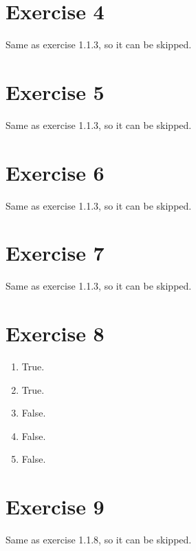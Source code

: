 \documentclass{article}
\begin{document}
    \section*{Exercise 4}
    Same as exercise 1.1.3, so it can be skipped.


    \section*{Exercise 5}
    Same as exercise 1.1.3, so it can be skipped.


    \section*{Exercise 6}
    Same as exercise 1.1.3, so it can be skipped.


    \section*{Exercise 7}
    Same as exercise 1.1.3, so it can be skipped.


    \section*{Exercise 8}
    \begin{enumerate}[label=\textbf{\alph*.}]
        \item
            True.
        \item
            True.
        \item 
            False.
        \item 
            False.
        \item
            False.
    \end{enumerate}


    \section*{Exercise 9}
    Same as exercise 1.1.8, so it can be skipped.
\end{document}
